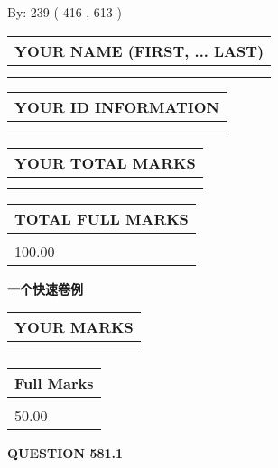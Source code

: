\documentclass{ctexart}
\begin{document}
   
\hspace{1.0in} By: 
 239 ( 416 ,  613 )
   
   
   
   
\newpage 
\setcounter{page}{ 
   581001 } 
   
   
   
   
\noindent\begin{tabular}{|l|}
\hline
YOUR NAME (FIRST, ... LAST)  \\
\hline
 \\ 
 \\ 
\hline
\end{tabular}
\hspace{0.05in} \begin{tabular}{|l|}
\hline
 YOUR   ID   INFORMATION  \\
\hline
 \\ 
 \\ 
\hline
\end{tabular}
   
   
\vspace{0.2in}\noindent\begin{tabular}{|l|}
\hline
YOUR TOTAL MARKS  \\
\hline
 \\ 
 \\ 
\hline
\end{tabular}
\hspace{0.05in} \begin{tabular}{|l|}
\hline
TOTAL FULL MARKS  \\
\hline
 \\ 
100.00 \\
\hline
\end{tabular}
   
   
 \vspace{0.2in}
{\LARGE {\textbf{ 一个快速卷例}}}
   
   
  
\vspace{0.2in}
  
\noindent\begin{tabular}{|l|}
\hline
 YOUR MARKS  \\
\hline
 \\ 
 \\ 
\hline
\end{tabular}
\hspace{0.05in} \begin{tabular}{|l|}
\hline
 Full Marks  \\
\hline
 \\ 
50.00 \\
\hline
\end{tabular}
{\textbf{\Large{QUESTION
581.1 
}}}
  
\end{document}
